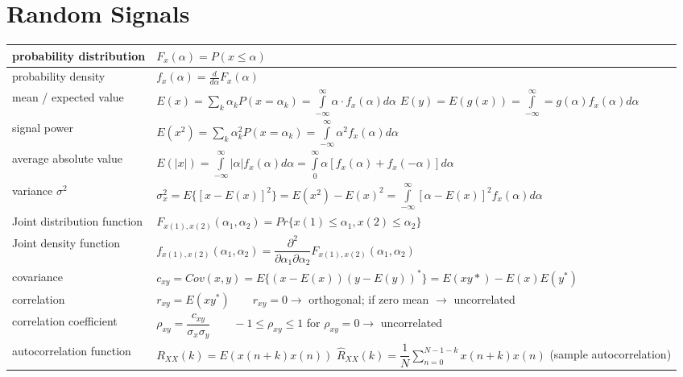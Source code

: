 \section{Random Signals}
\begin{tabularx}{\linewidth}{|l|X|}
	\hline
	probability distribution & $F_x(\alpha) = P(x \leq \alpha )$ \\
	\hline
	probability density & $f_x(\alpha) = \frac{d}{d\alpha}F_x(\alpha)$\\
	\hline
	mean / expected value & $E(x) = \sum\limits_k \alpha_k P(x = \alpha_k) =
	\int\limits_{-\infty}^{\infty}\alpha\cdot f_x(\alpha)d\alpha$ \newline
	$E(y) = E(g(x)) = \int\limits_{-\infty}^{\infty} = g(\alpha)f_x(\alpha)d\alpha $
	\\
	\hline
	signal power & $E( x^2 ) = \sum\limits_k \alpha_k^2 P(x = \alpha_k) =
	\int\limits_{-\infty}^{\infty} \alpha^2 f_x(\alpha) d\alpha$ \\
	\hline
	average absolute value & $E( |x| ) = \int\limits_{-\infty}^{\infty} |\alpha| f_x(\alpha) d\alpha 
										 = \int\limits_{0}^{\infty} \alpha[f_x(\alpha) + f_x(-\alpha)] d\alpha $
	\\ \hline
	variance $\sigma^2$ & 
	$\sigma_x^2 = E\{ [x-E( x )]^2 \} = E(x^2) - E(x)^2 = 
	\int\limits_{-\infty}^{\infty}[\alpha - E( x )]^2 f_x(\alpha) d\alpha $
	\\ \hline
	Joint distribution function &
	$ F_{x(1),x(2)} (\alpha_1 , \alpha _2) = Pr\{ x(1) \leq \alpha _1 , x(2) \leq \alpha _2 \} $
	\\ \hline
	Joint density function &
	$ f_{x(1), x(2)} (\alpha _1, \alpha _2) = \dfrac{\partial^2}{\partial \alpha _1 \partial \alpha _2} F_{x(1),x(2)} 
	(\alpha_1 , \alpha_2) $
	\\ \hline
	covariance &
	$c_{xy} = Cov(x,y) = E\{(x-E(x))(y-E(y))^*\} = E(xy*) - E(x)E(y^*)$
	\\ \hline
  correlation &
  $r_{xy} = E(xy^*)  \qquad r_{xy} = 0 \rightarrow$ orthogonal; if zero mean $\rightarrow$ uncorrelated
	\\ \hline
  correlation coefficient &
  $\rho_{xy} = \dfrac{c_{xy}}{\sigma_x\sigma_y} \qquad -1\leq \rho_{xy} \leq 1$ \newline
  for $\rho_{xy} = 0 \rightarrow$ uncorrelated
	\\ \hline
	autocorrelation function & 
	$R_{XX}(k) = E(x(n+k)x(n))$ \newline
	$\hat{R}_{XX}(k) = \dfrac{1}{N}\sum\limits_{n=0}^{N-1-k} x(n+k)x(n)$ \qquad (sample autocorrelation) \newline

\end{tabularx}
